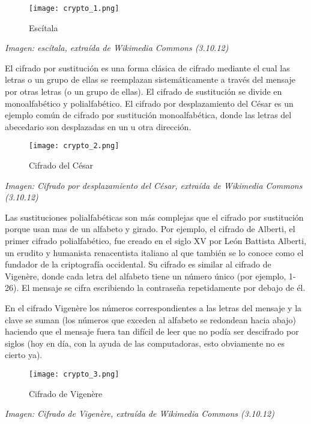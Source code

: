 \documentclass[10pt,a5paper,twoside,,]{book}
\begin{document}
\begin{figure}[htbp]
\centering
\texttt{[image: crypto\_1.png]}
\caption{Escítala}
\end{figure}

\emph{Imagen: escítala, extraída de Wikimedia Commons (3.10.12)}

El cifrado por sustitución es una forma clásica de cifrado mediante el
cual las letras o un grupo de ellas se reemplazan sistemáticamente a
través del mensaje por otras letras (o un grupo de ellas). El cifrado de
sustitución se divide en monoalfabético y polialfabético. El cifrado por
desplazamiento del César es un ejemplo común de cifrado por sustitución
monoalfabética, donde las letras del abecedario son desplazadas en un u
otra dirección.

\begin{figure}[htbp]
\centering
\texttt{[image: crypto\_2.png]}
\caption{Cifrado del César}
\end{figure}

\emph{Imagen: Cifrado por desplazamiento del César, extraída de
Wikimedia Commons (3.10.12)}

Las sustituciones polialfabéticas son más complejas que el cifrado por
sustitución porque usan mas de un alfabeto y girado. Por ejemplo, el
cifrado de Alberti, el primer cifrado polialfabético, fue creado en el
siglo XV por León Battista Alberti, un erudito y humanista renacentista
italiano al que también se lo conoce como el fundador de la criptografía
occidental. Su cifrado es similar al cifrado de Vigenère, donde cada
letra del alfabeto tiene un número único (por ejemplo, 1-26). El mensaje
se cifra escribiendo la contraseña repetidamente por debajo de él.

En el cifrado Vigenère los números correspondientes a las letras del
mensaje y la clave se suman (los números que exceden al alfabeto se
redondean hacia abajo) haciendo que el mensaje fuera tan difícil de leer
que no podía ser descifrado por siglos (hoy en día, con la ayuda de las
computadoras, esto obviamente no es cierto ya).

\begin{figure}[htbp]
\centering
\texttt{[image: crypto\_3.png]}
\caption{Cifrado de Vigenère}
\end{figure}

\emph{Imagen: Cifrado de Vigenère, extraída de Wikimedia Commons
(3.10.12)}
\end{document}
